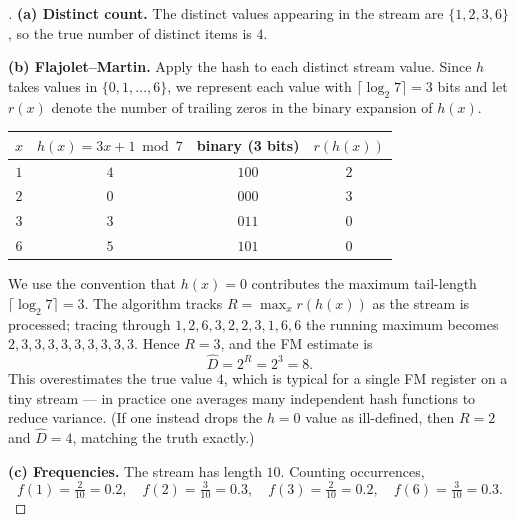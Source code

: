 \documentclass[en,hazy,blue,12pt,normal]{../../elegantnote}
\begin{document}
\begin{proof}[\solutionname]

\textbf{(a) Distinct count.} The distinct values appearing in the stream are $\{1,2,3,6\}$, so the true number of distinct items is $4$.

\textbf{(b) Flajolet–Martin.} Apply the hash to each distinct stream value. Since $h$ takes values in $\{0,1,\dots,6\}$, we represent each value with $\lceil\log_2 7\rceil=3$ bits and let $r(x)$ denote the number of trailing zeros in the binary expansion of $h(x)$.
\begin{center}
\begin{tabular}{c|c|c|c}
$x$ & $h(x)=3x+1 \bmod 7$ & binary (3 bits) & $r(h(x))$ \\\hline
$1$ & $4$ & $100$ & $2$ \\
$2$ & $0$ & $000$ & $3$ \\
$3$ & $3$ & $011$ & $0$ \\
$6$ & $5$ & $101$ & $0$
\end{tabular}
\end{center}
We use the convention that $h(x)=0$ contributes the maximum tail-length $\lceil\log_2 7\rceil=3$. The algorithm tracks $R=\max_x r(h(x))$ as the stream is processed; tracing through $1,2,6,3,2,2,3,1,6,6$ the running maximum becomes $2,3,3,3,3,3,3,3,3,3$. Hence $R=3$, and the FM estimate is
\[
\widehat{D}=2^{R}=2^{3}=8.
\]
This overestimates the true value $4$, which is typical for a single FM register on a tiny stream — in practice one averages many independent hash functions to reduce variance. (If one instead drops the $h=0$ value as ill-defined, then $R=2$ and $\widehat D=4$, matching the truth exactly.)

\textbf{(c) Frequencies.} The stream has length $10$. Counting occurrences,
\[
f(1)=\tfrac{2}{10}=0.2,\quad f(2)=\tfrac{3}{10}=0.3,\quad f(3)=\tfrac{2}{10}=0.2,\quad f(6)=\tfrac{3}{10}=0.3.
\]
\end{proof}
\end{document}
